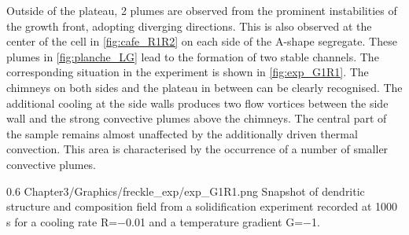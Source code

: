 Outside of the plateau, 2 plumes are observed from the prominent instabilities of the growth front, adopting diverging directions. 
This is also observed at the center of the cell in \cref{fig:cafe_R1R2} on each side of the A-shape segregate. 
These plumes in \cref{fig:planche_LG} lead to the formation of two stable channels. 
The corresponding situation in the experiment is shown in \cref{fig:exp_G1R1}. The chimneys on both sides and the plateau in between can be clearly 
recognised. The additional cooling at the side walls produces two flow vortices between the side wall and the strong convective plumes above the 
chimneys. The central part of the sample remains almost unaffected by the additionally driven thermal convection. This area is characterised by 
the occurrence of a number of smaller convective plumes.  
%
\begin{figureth}
{0.6}
{Chapter3/Graphics/freckle_exp/exp_G1R1.png}
{Snapshot of dendritic structure and composition field from a 
solidification experiment recorded at 1000 s for a cooling rate R=\SI{-0.01}{\uCR} and a temperature gradient G=\SI{-1}{\ugradT}.}
\label{fig:exp_G1R1}
\end{figureth}
%
